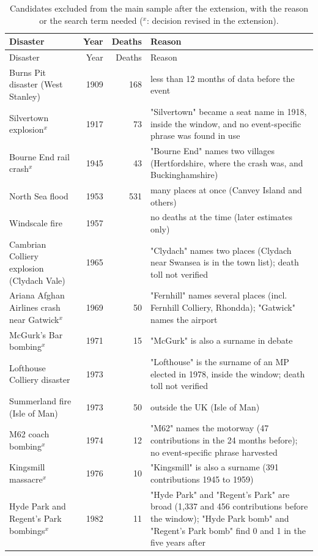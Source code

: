 \documentclass[11pt,a4paper]{article}
\begin{document}
{\footnotesize\begin{longtable}{p{5.4cm}rrp{8cm}}\caption{Candidates excluded from the main sample after the extension, with the reason or the search term needed ($^x$: decision revised in the extension).}\label{tab:excl}\\\toprule Disaster & Year & Deaths & Reason\\\midrule\endfirsthead\toprule Disaster & Year & Deaths & Reason\\\midrule\endhead\bottomrule\endfoot
Burns Pit disaster (West Stanley) & 1909 & 168 & less than 12 months of data before the event\\
Silvertown explosion$^x$ & 1917 & 73 & "Silvertown" became a seat name in 1918, inside the window, and no event-specific phrase was found in use\\
Bourne End rail crash$^x$ & 1945 & 43 & "Bourne End" names two villages (Hertfordshire, where the crash was, and Buckinghamshire)\\
North Sea flood & 1953 & 531 & many places at once (Canvey Island and others)\\
Windscale fire & 1957 &  & no deaths at the time (later estimates only)\\
Cambrian Colliery explosion (Clydach Vale) & 1965 &  & "Clydach" names two places (Clydach near Swansea is in the town list); death toll not verified\\
Ariana Afghan Airlines crash near Gatwick$^x$ & 1969 & 50 & "Fernhill" names several places (incl. Fernhill Colliery, Rhondda); "Gatwick" names the airport\\
McGurk's Bar bombing$^x$ & 1971 & 15 & "McGurk" is also a surname in debate\\
Lofthouse Colliery disaster & 1973 &  & "Lofthouse" is the surname of an MP elected in 1978, inside the window; death toll not verified\\
Summerland fire (Isle of Man) & 1973 & 50 & outside the UK (Isle of Man)\\
M62 coach bombing$^x$ & 1974 & 12 & "M62" names the motorway (47 contributions in the 24 months before); no event-specific phrase harvested\\
Kingsmill massacre$^x$ & 1976 & 10 & "Kingsmill" is also a surname (391 contributions 1945 to 1959)\\
Hyde Park and Regent's Park bombings$^x$ & 1982 & 11 & "Hyde Park" and "Regent's Park" are broad (1,337 and 456 contributions before the window); "Hyde Park bomb" and "Regent's Park bomb" find 0 and 1 in the five years after\\

\end{longtable}}
\end{document}
